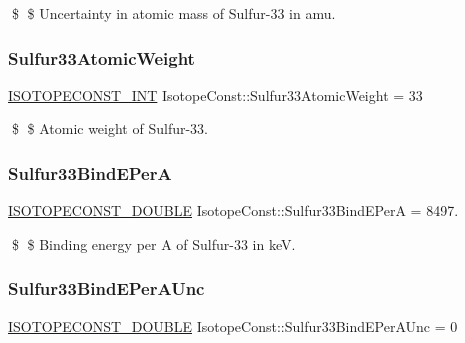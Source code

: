 \$ \$ Uncertainty in atomic mass of Sulfur-\/33 in amu. \mbox{\label{group___isotope_const-_sulfur-_s33_ga674be6ce647896ee753c75655993103c}} 
\subsubsection{\texorpdfstring{Sulfur33\+Atomic\+Weight}{Sulfur33AtomicWeight}}
{\footnotesize\ttfamily \mbox{\hyperlink{group___isotope_const-_macros_ga5f18360b3e99483a35c32d789e62621c}{I\+S\+O\+T\+O\+P\+E\+C\+O\+N\+S\+T\+\_\+\+I\+NT}} Isotope\+Const\+::\+Sulfur33\+Atomic\+Weight = 33}

\$ \$ Atomic weight of Sulfur-\/33. \mbox{\label{group___isotope_const-_sulfur-_s33_gae7157e250303582c067cb263e71d63ea}} 
\subsubsection{\texorpdfstring{Sulfur33\+Bind\+E\+PerA}{Sulfur33BindEPerA}}
{\footnotesize\ttfamily \mbox{\hyperlink{group___isotope_const-_macros_ga8f45a7272ce02c0b4c65c44636ed719a}{I\+S\+O\+T\+O\+P\+E\+C\+O\+N\+S\+T\+\_\+\+D\+O\+U\+B\+LE}} Isotope\+Const\+::\+Sulfur33\+Bind\+E\+PerA = 8497.}

\$ \$ Binding energy per A of Sulfur-\/33 in keV. \mbox{\label{group___isotope_const-_sulfur-_s33_gaa7c0f86449b3987cfd35e251ecfbb574}} 
\subsubsection{\texorpdfstring{Sulfur33\+Bind\+E\+Per\+A\+Unc}{Sulfur33BindEPerAUnc}}
{\footnotesize\ttfamily \mbox{\hyperlink{group___isotope_const-_macros_ga8f45a7272ce02c0b4c65c44636ed719a}{I\+S\+O\+T\+O\+P\+E\+C\+O\+N\+S\+T\+\_\+\+D\+O\+U\+B\+LE}} Isotope\+Const\+::\+Sulfur33\+Bind\+E\+Per\+A\+Unc = 0}

